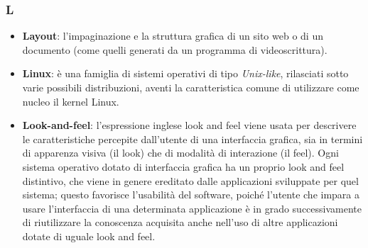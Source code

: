 \subsubsection{L}
\begin{itemize}
	\item \textbf{Layout}: l'impaginazione e la struttura grafica di un sito web o di un documento (come quelli generati da un programma di videoscrittura).
	\item \textbf{Linux}: è una famiglia di sistemi operativi di tipo \textit{Unix-like}, rilasciati sotto varie possibili distribuzioni, aventi la caratteristica comune di utilizzare come nucleo il kernel Linux.
	\item \textbf{Look-and-feel}: l'espressione inglese look and feel viene usata per descrivere le caratteristiche percepite dall'utente di una interfaccia grafica, sia in termini di apparenza visiva (il look) che di modalità di interazione (il feel). Ogni sistema operativo dotato di interfaccia grafica ha un proprio look and feel distintivo, che viene in genere ereditato dalle applicazioni sviluppate per quel sistema; questo favorisce l'usabilità del software, poiché l'utente che impara a usare l'interfaccia di una determinata applicazione è in grado successivamente di riutilizzare la conoscenza acquisita anche nell'uso di altre applicazioni dotate di uguale look and feel.
\end{itemize}

